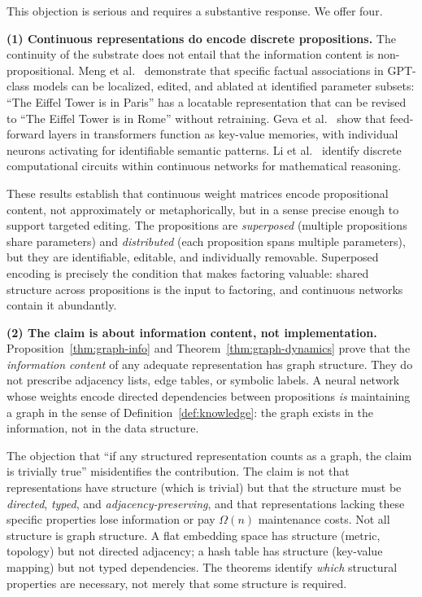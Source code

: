 \documentclass[11pt]{article}
\theoremstyle{definition}
\begin{document}
This objection is serious and requires a substantive response. We offer
four.

\textbf{(1) Continuous representations do encode discrete
propositions.}
The continuity of the substrate does not entail that the information
content is non-propositional. Meng et al.\ \cite{Meng2022} demonstrate
that specific factual associations in GPT-class models can be localized,
edited, and ablated at identified parameter subsets: ``The Eiffel Tower
is in Paris'' has a locatable representation that can be revised to ``The Eiffel Tower is in Rome'' without retraining. Geva
et al.\ \cite{Geva2021} show that feed-forward layers in transformers
function as key-value memories, with individual neurons activating for
identifiable semantic patterns. Li et al.\ \cite{Li2024} identify discrete computational circuits
within continuous networks for mathematical reasoning.

These results establish that continuous weight matrices encode
propositional content, not approximately or metaphorically, but in a
sense precise enough to support targeted editing. The propositions are
\emph{superposed} (multiple propositions share parameters) and
\emph{distributed} (each proposition spans multiple parameters), but
they are identifiable, editable, and individually removable. Superposed
encoding is precisely the condition that makes factoring valuable: shared
structure across propositions is the input to factoring, and continuous
networks contain it abundantly.

\textbf{(2) The claim is about information content, not
implementation.}
Proposition~\ref{thm:graph-info} and Theorem~\ref{thm:graph-dynamics} prove that
the \emph{information content} of any adequate representation has graph
structure. They do not prescribe adjacency lists, edge tables, or
symbolic labels. A neural network whose weights encode directed
dependencies between propositions \emph{is} maintaining a graph in the
sense of Definition~\ref{def:knowledge}: the graph exists in the
information, not in the data structure.

The objection that ``if any structured representation counts as a
graph, the claim is trivially true'' misidentifies the contribution.
The claim is not that representations have structure (which is trivial)
but that the structure must be \emph{directed}, \emph{typed}, and
\emph{adjacency-preserving}, and that representations lacking these
specific properties lose information or pay $\Omega(n)$ maintenance
costs. Not all structure is graph structure. A flat embedding space has
structure (metric, topology) but not directed adjacency; a hash table
has structure (key-value mapping) but not typed dependencies. The
theorems identify \emph{which} structural properties are necessary, not
merely that some structure is required.
\end{document}
